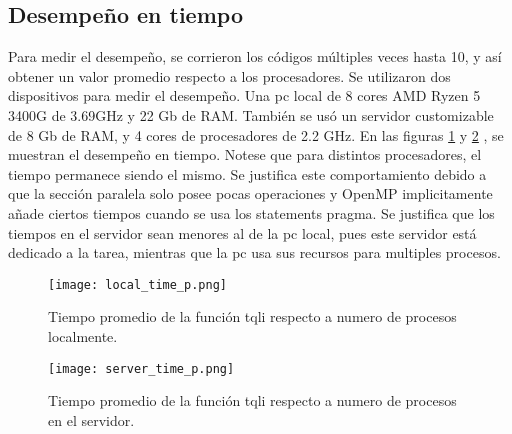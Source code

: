 \subsection{Desempeño en tiempo}
Para medir el desempeño, se corrieron los códigos múltiples veces hasta 10, y así obtener un valor promedio respecto a los procesadores.
Se utilizaron dos dispositivos para medir el desempeño. Una pc local de 8 cores AMD Ryzen 5 3400G de 3.69GHz y 22 Gb de RAM. También se usó un servidor customizable de 8 Gb de RAM, y 4 cores de procesadores de 2.2 GHz. En las figuras \ref{fig:local_time_p} y \ref{fig:server_time_p} , se muestran el desempeño en tiempo. Notese que para distintos procesadores, el tiempo permanece siendo el mismo. Se justifica este comportamiento debido a que la sección paralela solo posee pocas operaciones y OpenMP implicitamente añade ciertos tiempos cuando se usa los statements pragma. Se justifica que los tiempos en el servidor sean menores al de la pc local, pues este servidor está dedicado a la tarea, mientras que la pc usa sus recursos para multiples procesos.

\begin{figure}
	\centering
	\texttt{[image: local\_time\_p.png]}
	\caption{Tiempo promedio de la función tqli respecto a numero de procesos localmente.}
	\label{fig:local_time_p}
\end{figure}
\begin{figure}
	\centering
	\texttt{[image: server\_time\_p.png]}
	\caption{Tiempo promedio de la función tqli respecto a numero de procesos en el servidor.}
	\label{fig:server_time_p}
\end{figure}





	      	          


